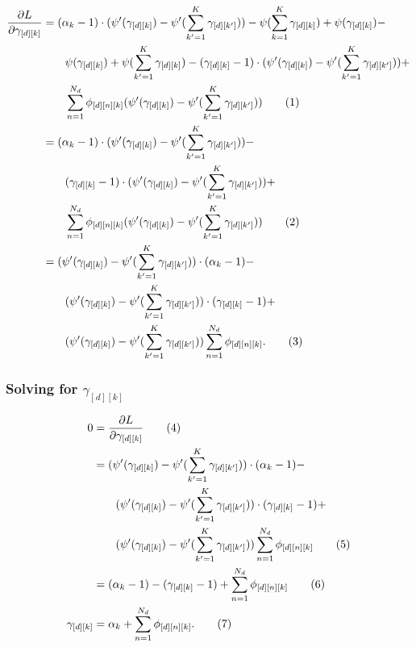 \documentclass[12pt]{article}
\newcommand\numberthis{\addtocounter{equation}{1}\tag{\theequation}}
\begin{document}
\begin{align*}
    \frac{\partial L}{\partial \gamma_{[d][k]}}
    &=
    (\alpha_{k} - 1) \cdot (\psi'(\gamma_{[d][k]}) - \psi'(\sum_{k'=1}^{K}
    \gamma_{[d][k']})) - \psi(\sum_{k=1}^{K} \gamma_{[d][k]}) +
    \psi(\gamma_{[d][k]}) -
    \\* & \quad\quad \psi(\gamma_{[d][k]}) + \psi(\sum_{k'=1}^{K}
    \gamma_{[d][k]}) -
    (\gamma_{[d][k]} - 1) \cdot (\psi'(\gamma_{[d][k]}) - \psi'(\sum_{k'=1}^{K}
    \gamma_{[d][k']})) +
    \\* & \quad\quad \sum_{n=1}^{N_{d}} \phi_{[d][n][k]} (\psi'(\gamma_{[d][k]})
    - \psi'(\sum_{k'=1}^{K} \gamma_{[d][k']}))
    \numberthis
    \\ &=
    (\alpha_{k} - 1) \cdot (\psi'(\gamma_{[d][k]}) - \psi'(\sum_{k'=1}^{K}
    \gamma_{[d][k']})) -
    \\* & \quad\quad
    (\gamma_{[d][k]} - 1) \cdot (\psi'(\gamma_{[d][k]}) - \psi'(\sum_{k'=1}^{K}
    \gamma_{[d][k']})) +
    \\* & \quad\quad \sum_{n=1}^{N_{d}} \phi_{[d][n][k]} (\psi'(\gamma_{[d][k]})
    - \psi'(\sum_{k'=1}^{K} \gamma_{[d][k']}))
    \numberthis
    \\ &=
    (\psi'(\gamma_{[d][k]}) - \psi'(\sum_{k'=1}^{K}
    \gamma_{[d][k']})) \cdot (\alpha_{k} - 1) -
    \\* & \quad\quad
    (\psi'(\gamma_{[d][k]}) - \psi'(\sum_{k'=1}^{K}
    \gamma_{[d][k']})) \cdot (\gamma_{[d][k]} - 1) +
    \\* & \quad\quad (\psi'(\gamma_{[d][k]})
    - \psi'(\sum_{k'=1}^{K} \gamma_{[d][k']}))
    \sum_{n=1}^{N_{d}} \phi_{[d][n][k]}.
    \numberthis
\end{align*}

\subsubsection{Solving for $\gamma_{[d][k]}$}

\begin{align*}
    0 &= \frac{\partial L}{\partial \gamma_{[d][k]}} \numberthis
    \\ &=
    (\psi'(\gamma_{[d][k]}) - \psi'(\sum_{k'=1}^{K}
    \gamma_{[d][k']})) \cdot (\alpha_{k} - 1) -
    \\* & \quad\quad
    (\psi'(\gamma_{[d][k]}) - \psi'(\sum_{k'=1}^{K}
    \gamma_{[d][k']})) \cdot (\gamma_{[d][k]} - 1) +
    \\* & \quad\quad (\psi'(\gamma_{[d][k]})
    - \psi'(\sum_{k'=1}^{K} \gamma_{[d][k']}))
    \sum_{n=1}^{N_{d}} \phi_{[d][n][k]}
    \numberthis
    \\ &=
    (\alpha_{k} - 1) -
    (\gamma_{[d][k]} - 1) + \sum_{n=1}^{N_{d}} \phi_{[d][n][k]}
    \numberthis
    \\*
    \gamma_{[d][k]} &= \alpha_{k} + \sum_{n=1}^{N_{d}} \phi_{[d][n][k]}.
    \numberthis
\end{align*}
\end{document}

